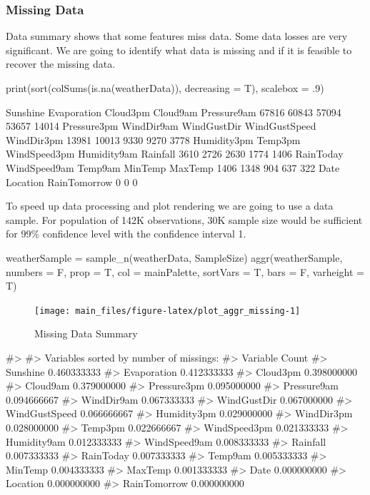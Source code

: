 \hypertarget{missing-data}{%
\subsubsection{Missing Data}\label{missing-data}}

Data summary shows that some features miss data. Some data losses are
very significant. We are going to identify what data is missing and if
it is feasible to recover the missing data.

\begin{Sinput}
print(sort(colSums(is.na(weatherData)), decreasing = T), scalebox = .9)
\end{Sinput}

Sunshine Evaporation Cloud3pm Cloud9am Pressure9am 67816 60843 57094
53657 14014 Pressure3pm WindDir9am WindGustDir WindGustSpeed WindDir3pm
13981 10013 9330 9270 3778 Humidity3pm Temp3pm WindSpeed3pm Humidity9am
Rainfall 3610 2726 2630 1774 1406 RainToday WindSpeed9am Temp9am MinTemp
MaxTemp 1406 1348 904 637 322 Date Location RainTomorrow 0 0 0

To speed up data processing and plot rendering we are going to use a
data sample. For population of 142K observations, 30K sample size would
be sufficient for 99\% confidence level with the confidence interval 1.

\begin{Schunk}
\begin{Sinput}
weatherSample = sample_n(weatherData, SampleSize)
aggr(weatherSample, numbers = F, prop = T, col = mainPalette, sortVars = T, bars = F, varheight = T)
\end{Sinput}
\begin{figure}[H]

{\centering \texttt{[image: main\_files/figure-latex/plot\_aggr\_missing-1]} 

}

\caption[Missing Data Summary]{Missing Data Summary}\label{fig:plot_aggr_missing}
\end{figure}
\begin{Soutput}
#> 
#>  Variables sorted by number of missings: 
#>       Variable       Count
#>       Sunshine 0.460333333
#>    Evaporation 0.412333333
#>       Cloud3pm 0.398000000
#>       Cloud9am 0.379000000
#>    Pressure3pm 0.095000000
#>    Pressure9am 0.094666667
#>     WindDir9am 0.067333333
#>    WindGustDir 0.067000000
#>  WindGustSpeed 0.066666667
#>    Humidity3pm 0.029000000
#>     WindDir3pm 0.028000000
#>        Temp3pm 0.022666667
#>   WindSpeed3pm 0.021333333
#>    Humidity9am 0.012333333
#>   WindSpeed9am 0.008333333
#>       Rainfall 0.007333333
#>      RainToday 0.007333333
#>        Temp9am 0.005333333
#>        MinTemp 0.004333333
#>        MaxTemp 0.001333333
#>           Date 0.000000000
#>       Location 0.000000000
#>   RainTomorrow 0.000000000
\end{Soutput}
\end{Schunk}

